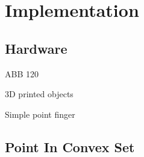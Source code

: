 \documentclass[conference]{IEEEtran}
\begin{document}
\section{Implementation}

\subsection{Hardware}
\begin{inparaenum}
\item ABB 120
\item 3D printed objects
\item Simple point finger
\end{inparaenum}

\subsection{Point In Convex Set}
\end{document}
